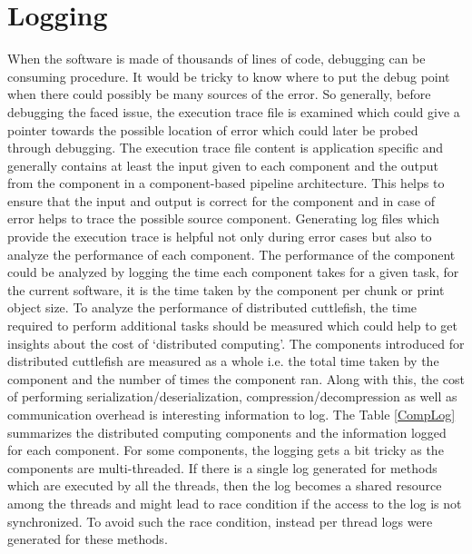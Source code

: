 \section{Logging}

When the software is made of thousands of lines of code, debugging can be consuming procedure. It would be tricky to know where to put the debug point when there  could possibly be many sources of the error. So generally, before debugging the faced issue, the execution trace file is examined which could give a pointer towards the possible location of error which could later be probed through debugging. The execution trace file content is application specific and generally contains at least the input given to each component and the output from the component in a component-based pipeline architecture. This helps to ensure that the input and output is correct for the component and in case of error helps to trace the possible source component. \newline    
Generating log files which provide the execution trace is helpful not only during error cases but also to analyze the performance of each component. The performance of the component could be analyzed by logging the time each component takes for a given task, for the current software, it is the time taken by the component per chunk or print object size. To analyze the performance of distributed cuttlefish, the time required to perform additional tasks should be measured which could help to get insights about the cost of {\lq}distributed computing{\rq}. The components introduced for distributed cuttlefish are measured as a whole i.e. the total time taken by the component and the number of times the component ran. Along with this, the cost of performing serialization/deserialization, compression/decompression as well as communication overhead is interesting information to log. The Table \ref{CompLog} summarizes the distributed computing components and the information logged for each component. For some components, the logging gets a bit tricky as the components are multi-threaded. If there is a single log generated for methods which are executed by all the threads, then the log becomes a shared resource among the threads and might lead to race condition if the access to the log is not synchronized. To avoid such the race condition, instead per thread logs were generated for these methods.  


